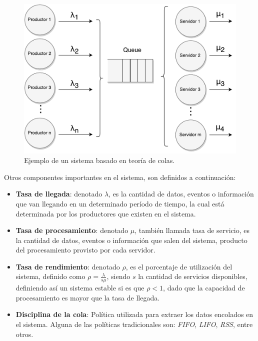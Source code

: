 \begin{figure}[!ht]
	\centering
	\includegraphics[scale=0.6]{images/TeoriaColas.pdf}
	\caption{Ejemplo de un sistema basado en teoría de colas.}
	\label{fig:teoriaColas}
\end{figure}

Otros componentes importantes en el sistema, son definidos a continuación:
\begin{itemize}
	\item \textbf{Tasa de llegada}: denotado $\lambda$, es la cantidad de datos, eventos o información que van llegando en un determinado período de tiempo, la cual está determinada por los productores que existen en el sistema.
	\item \textbf{Tasa de procesamiento}: denotado $\mu$, también llamada tasa de servicio, es la cantidad de datos, eventos o información que salen del sistema, producto del procesamiento provisto por cada servidor.
	\item \textbf{Tasa de rendimiento}: denotado $\rho$, es el porcentaje de utilización del sistema, definido como $\rho = \frac{\lambda}{s\mu}$, siendo $s$ la cantidad de servicios disponibles, definiendo así un sistema estable si es que $\rho < 1$, dado que la capacidad de procesamiento es mayor que la tasa de llegada.
	\item \textbf{Disciplina de la cola}: Política utilizada para extraer los datos encolados en el sistema. Alguna de las políticas tradicionales son: \textit{FIFO}, \textit{LIFO}, \textit{RSS}, entre otros.
\end{itemize}

